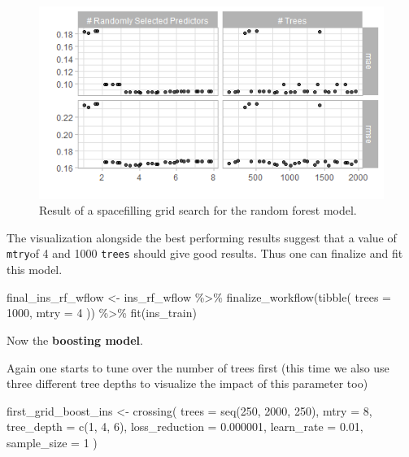\documentclass[
]{book}
\newenvironment{Shaded}{\begin{snugshade}}{\end{snugshade}}
\newcommand{\AttributeTok}[1]{\textcolor[rgb]{0.77,0.63,0.00}{#1}}
\newcommand{\DecValTok}[1]{\textcolor[rgb]{0.00,0.00,0.81}{#1}}
\newcommand{\FloatTok}[1]{\textcolor[rgb]{0.00,0.00,0.81}{#1}}
\newcommand{\FunctionTok}[1]{\textcolor[rgb]{0.00,0.00,0.00}{#1}}
\newcommand{\NormalTok}[1]{#1}
\newcommand{\OtherTok}[1]{\textcolor[rgb]{0.56,0.35,0.01}{#1}}
\newcommand{\SpecialCharTok}[1]{\textcolor[rgb]{0.00,0.00,0.00}{#1}}
\begin{document}
\begin{figure}

{\centering \includegraphics[width=0.7\linewidth]{_pictures/rf_ins_tune_plot} 

}

\caption{Result of a spacefilling grid search for the random forest model.}\label{fig:rfInstuneplot}
\end{figure}

The visualization alongside the best performing results suggest that a value of \texttt{mtry}of 4 and 1000 \texttt{trees} should give good results. Thus one can finalize and fit this model.

\begin{Shaded}
\begin{Highlighting}[]
\NormalTok{final\_ins\_rf\_wflow }\OtherTok{\textless{}{-}} 
\NormalTok{  ins\_rf\_wflow }\SpecialCharTok{\%\textgreater{}\%} 
  \FunctionTok{finalize\_workflow}\NormalTok{(}\FunctionTok{tibble}\NormalTok{(}
    \AttributeTok{trees =} \DecValTok{1000}\NormalTok{,}
    \AttributeTok{mtry =} \DecValTok{4}
\NormalTok{  )) }\SpecialCharTok{\%\textgreater{}\%}
  \FunctionTok{fit}\NormalTok{(ins\_train)}
\end{Highlighting}
\end{Shaded}

Now the \textbf{boosting model}.

Again one starts to tune over the number of trees first (this time we also use three different tree depths to visualize the impact of this parameter too)

\begin{Shaded}
\begin{Highlighting}[]
\NormalTok{first\_grid\_boost\_ins }\OtherTok{\textless{}{-}} \FunctionTok{crossing}\NormalTok{(}
  \AttributeTok{trees =} \FunctionTok{seq}\NormalTok{(}\DecValTok{250}\NormalTok{, }\DecValTok{2000}\NormalTok{, }\DecValTok{250}\NormalTok{),}
  \AttributeTok{mtry =} \DecValTok{8}\NormalTok{,}
  \AttributeTok{tree\_depth =} \FunctionTok{c}\NormalTok{(}\DecValTok{1}\NormalTok{, }\DecValTok{4}\NormalTok{, }\DecValTok{6}\NormalTok{),}
  \AttributeTok{loss\_reduction =} \FloatTok{0.000001}\NormalTok{,}
  \AttributeTok{learn\_rate =} \FloatTok{0.01}\NormalTok{,}
  \AttributeTok{sample\_size =} \DecValTok{1}
\NormalTok{)}
\end{Highlighting}
\end{Shaded}
\end{document}
